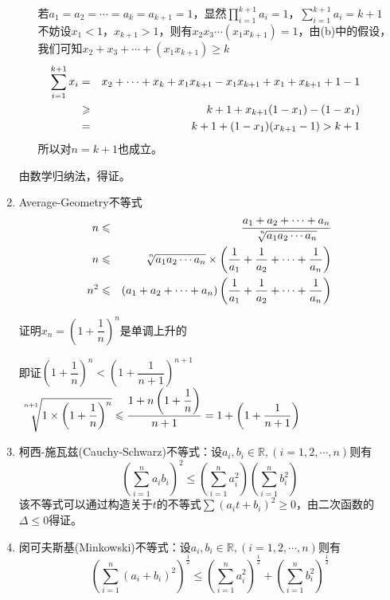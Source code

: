 \documentclass[11pt,fleqn]{book} %
\begin{document}
\begin{enumerate}
\begin{prove}
\begin{enumerate}[label=(\arabic*)]
  若$a_1=a_2=\cdots=a_k=a_{k+1}=1$，显然$\prod\limits_{i=1}^{k+1}a_i = 1$，$\sum\limits_{i=1}^{k+1}a_i = k+1$\\
  不妨设$x_1<1$，$x_{k+1}>1$，则有$x_2x_3\cdots(x_1x_{k+1})=1$，由(b)中的假设，我们可知$x_2+x_3+\cdots+(x_1x_{k+1})\geqslant k$
  \begin{eqnarray*}
    \hspace{-2.5em}\sum\limits_{i=1}^{k+1}x_i &=& x_2+\cdots+x_k+ x_1x_{k+1} - x_1x_{k+1}+x_1+x_{k+1}+1-1\\
    \hspace{-2.5em}~ &\geqslant& k+1+x_{k+1}(1-x_1)-(1-x_1)\\
    \hspace{-2.5em}~ &=& k+1+(1-x_1)(x_{k+1}-1) > k+1
  \end{eqnarray*}
  所以对$n=k+1$也成立。
  \end{enumerate}
  由数学归纳法，得证。
\end{prove}
\item Average-Geometry不等式
\begin{eqnarray}
  n &\leqslant& \dfrac{a_1+a_2+\cdots + a_n}{\sqrt[\leftroot{-2}\uproot{4}n]{a_1a_2\cdots a_n}} \\
  n &\leqslant& \sqrt[\leftroot{-2}\uproot{4}n]{a_1a_2\cdots a_n} \times \left(\frac{1}{a_1}+\frac{1}{a_2}+\cdots + \frac{1}{a_n}\right) \\
  n^2 &\leqslant&  (a_1+a_2+\cdots + a_n)\left(\frac{1}{a_1}+\frac{1}{a_2}+\cdots + \frac{1}{a_n}\right)
\end{eqnarray}
\begin{example}
证明$x_n = \left(1+\dfrac{1}{n}\right)^n$是单调上升的
\end{example}
\begin{prove}
即证$\left(1+\dfrac{1}{n}\right)^n < \left(1+\dfrac{1}{n+1}\right)^{n+1}$\\
$\sqrt[\leftroot{-2}\uproot{12}n+1]{1\times\left(1+\dfrac{1}{n}\right)^n} \leqslant \dfrac{1+n\left(1+\dfrac{1}{n}\right)}{n+1}=1+\left(1+\dfrac{1}{n+1}\right)$
\end{prove}
\vspace{0.2cm}
\item 柯西-施瓦兹(Cauchy-Schwarz)不等式：设$a_i, b_i \in \mathds{R}, (i=1,2,\cdots,n)$则有
\begin{equation}\label{cauchyschwarz}
\left(\sum_{i=1}^{n}a_ib_i\right)^2\leqslant \left(\sum_{i=1}^{n}a_i^2\right)\left(\sum_{i=1}^{n}b_i^2\right)
\end{equation}
该不等式可以通过构造关于$t$的不等式$\sum(a_it+b_i)^2\geqslant 0$，由二次函数的$\Delta\leqslant 0$得证。
\item 闵可夫斯基(Minkowski)不等式：设$a_i, b_i \in \mathds{R}, (i=1,2,\cdots,n)$则有
\begin{equation}\label{minkowski}
\left(\sum_{i=1}^{n}(a_i+b_i)^2\right)^{\frac{1}{2}} \leqslant \left(\sum_{i=1}^{n}a_i^2\right)^{\frac{1}{2}}+\left(\sum_{i=1}^{n}b_i^2\right)^{\frac{1}{2}}
\end{equation}
\end{enumerate}
\end{document}
